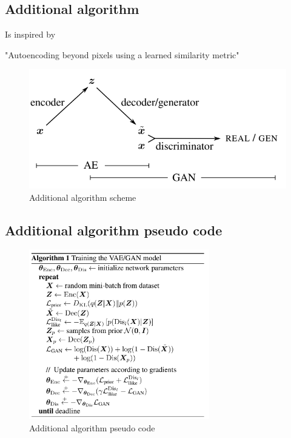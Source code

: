 \documentclass{article}
\begin{document}
    \subsection{Additional algorithm}
    Is inspired by

    "Autoencoding beyond pixels using a learned similarity metric"\cite{DBLP:journals/corr/LarsenSW15}
    \begin{figure}[!h]
        \includegraphics[width=\textwidth]{figures/additional.png}
        \caption{Additional algorithm scheme}
    \end{figure}


    \subsection{Additional algorithm pseudo code}
    \begin{figure}[!h]
        \includegraphics[width=0.7\textwidth]{figures/additional-code.png}
        \caption{Additional algorithm pseudo code}
    \end{figure}
\end{document}
